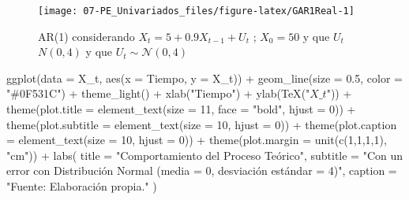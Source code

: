 \documentclass[
]{book}
\newenvironment{Shaded}{\begin{snugshade}}{\end{snugshade}}
\newcommand{\AttributeTok}[1]{\textcolor[rgb]{0.77,0.63,0.00}{#1}}
\newcommand{\DecValTok}[1]{\textcolor[rgb]{0.00,0.00,0.81}{#1}}
\newcommand{\FloatTok}[1]{\textcolor[rgb]{0.00,0.00,0.81}{#1}}
\newcommand{\FunctionTok}[1]{\textcolor[rgb]{0.00,0.00,0.00}{#1}}
\newcommand{\NormalTok}[1]{#1}
\newcommand{\SpecialCharTok}[1]{\textcolor[rgb]{0.00,0.00,0.00}{#1}}
\newcommand{\StringTok}[1]{\textcolor[rgb]{0.31,0.60,0.02}{#1}}
\begin{document}
\begin{figure}

{\centering \texttt{[image: 07-PE\_Univariados\_files/figure-latex/GAR1Real-1]} 

}

\caption{AR(1) considerando $X_t=5+0.9X_{t-1}+U_t$ ; $X_0=50$ y que $U_t$~$N(0, 4)$ y que $U_t \sim \mathcal{N}(0, 4)$}\label{fig:GAR1Real}
\end{figure}

\begin{Shaded}
\begin{Highlighting}[]

\FunctionTok{ggplot}\NormalTok{(}\AttributeTok{data =}\NormalTok{ X\_t, }\FunctionTok{aes}\NormalTok{(}\AttributeTok{x =}\NormalTok{ Tiempo, }\AttributeTok{y =}\NormalTok{ X\_t)) }\SpecialCharTok{+} 
  \FunctionTok{geom\_line}\NormalTok{(}\AttributeTok{size =} \FloatTok{0.5}\NormalTok{, }\AttributeTok{color =} \StringTok{"\#0F531C"}\NormalTok{) }\SpecialCharTok{+}
  \FunctionTok{theme\_light}\NormalTok{() }\SpecialCharTok{+} 
  \FunctionTok{xlab}\NormalTok{(}\StringTok{"Tiempo"}\NormalTok{) }\SpecialCharTok{+} 
  \FunctionTok{ylab}\NormalTok{(}\FunctionTok{TeX}\NormalTok{(}\StringTok{"$X\_t$"}\NormalTok{)) }\SpecialCharTok{+} 
  \FunctionTok{theme}\NormalTok{(}\AttributeTok{plot.title =} \FunctionTok{element\_text}\NormalTok{(}\AttributeTok{size =} \DecValTok{11}\NormalTok{, }\AttributeTok{face =} \StringTok{"bold"}\NormalTok{, }\AttributeTok{hjust =} \DecValTok{0}\NormalTok{)) }\SpecialCharTok{+} 
  \FunctionTok{theme}\NormalTok{(}\AttributeTok{plot.subtitle =} \FunctionTok{element\_text}\NormalTok{(}\AttributeTok{size =} \DecValTok{10}\NormalTok{, }\AttributeTok{hjust =} \DecValTok{0}\NormalTok{)) }\SpecialCharTok{+} 
  \FunctionTok{theme}\NormalTok{(}\AttributeTok{plot.caption =} \FunctionTok{element\_text}\NormalTok{(}\AttributeTok{size =} \DecValTok{10}\NormalTok{, }\AttributeTok{hjust =} \DecValTok{0}\NormalTok{)) }\SpecialCharTok{+}
  \FunctionTok{theme}\NormalTok{(}\AttributeTok{plot.margin =} \FunctionTok{unit}\NormalTok{(}\FunctionTok{c}\NormalTok{(}\DecValTok{1}\NormalTok{,}\DecValTok{1}\NormalTok{,}\DecValTok{1}\NormalTok{,}\DecValTok{1}\NormalTok{), }\StringTok{"cm"}\NormalTok{)) }\SpecialCharTok{+}
  \FunctionTok{labs}\NormalTok{(}
    \AttributeTok{title =} \StringTok{"Comportamiento del Proceso Teórico"}\NormalTok{,}
    \AttributeTok{subtitle =} \StringTok{"Con un error con Distribución Normal (media = 0, desviación estándar = 4)"}\NormalTok{,}
    \AttributeTok{caption =} \StringTok{"Fuente: Elaboración propia."}
\NormalTok{  )}
\end{Highlighting}
\end{Shaded}
\end{document}
